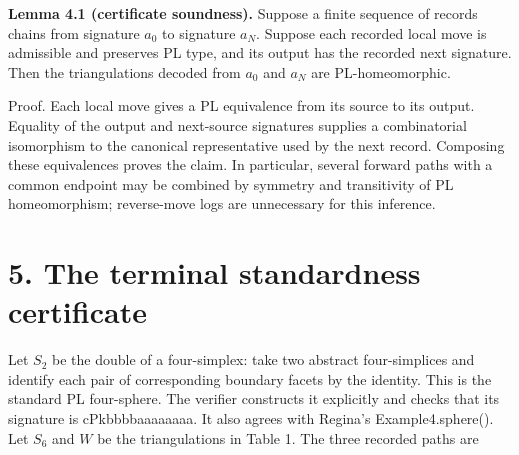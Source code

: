 \documentclass[11pt,letterpaper]{article}
\begin{document}
\medskip\noindent\textbf{Lemma 4.1 (certificate soundness).} Suppose a finite sequence of records chains from signature $a_0$ to signature $a_N$. Suppose each recorded local move is admissible and preserves PL type, and its output has the recorded next signature. Then the triangulations decoded from $a_0$ and $a_N$ are PL-homeomorphic.

Proof. Each local move gives a PL equivalence from its source to its output. Equality of the output and next-source signatures supplies a combinatorial isomorphism to the canonical representative used by the next record. Composing these equivalences proves the claim. In particular, several forward paths with a common endpoint may be combined by symmetry and transitivity of PL homeomorphism; reverse-move logs are unnecessary for this inference.

\section*{5. The terminal standardness certificate}
Let $S_2$ be the double of a four-simplex: take two abstract four-simplices and identify each pair of corresponding boundary facets by the identity. This is the standard PL four-sphere. The verifier constructs it explicitly and checks that its signature is \mbox{\small\ttfamily cPkbbbbaaaaaaaa}. It also agrees with Regina's Example4.sphere(). Let $S_6$ and $W$ be the triangulations in Table 1. The three recorded paths are
\end{document}
